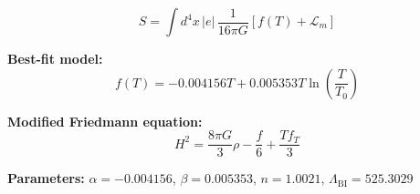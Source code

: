 
\begin{equation}
  S = \int d^4x \, |e| \, \frac{1}{16\pi G} \left[ f(T) + \mathcal{L}_m \right]
\end{equation}

\textbf{Best-fit model:}
\begin{equation}
  f(T) = -0.004156 T + 0.005353 T \ln\!\left(\frac{T}{T_0}\right)
\end{equation}

\textbf{Modified Friedmann equation:}
\begin{equation}
  H^2 = \frac{8\pi G}{3} \rho - \frac{f}{6} + \frac{T f_T}{3}
\end{equation}

\textbf{Parameters:}
$\alpha = -0.004156$, \quad
$\beta = 0.005353$, \quad
$n = 1.0021$, \quad
$\Lambda_{\text{BI}} = 525.3029$